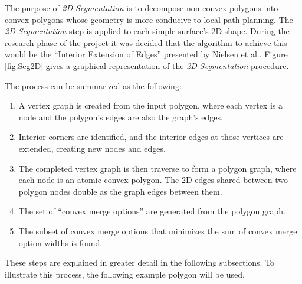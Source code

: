 The purpose of \textit{2D Segmentation} is to decompose non-convex polygons into convex polygons whose geometry is more conducive to local path planning.
The \textit{2D Segmentation} step is applied to each simple surface's 2D shape.
During the research phase of the project it was decided that the algorithm to achieve this would be the ``Interior Extension of Edges'' presented by Nielsen et al.\cite{IntEdgeExt}.
Figure \ref{fig:Seg2D} gives a graphical representation of the \textit{2D Segmentation} procedure.

The process can be summarized as the following:
\begin{enumerate}
	\item A vertex graph is created from the input polygon, where each vertex is a node and the polygon's edges are also the graph's edges.
	\item Interior corners are identified, and the interior edges at those vertices are extended, creating new nodes and edges.
	\item The completed vertex graph is then traverse to form a polygon graph, where each node is an atomic convex polygon.
		The 2D edges shared between two polygon nodes double as the graph edges between them.
	\item The set of ``convex merge options'' are generated from the polygon graph.
	\item The subset of convex merge options that minimizes the sum of convex merge option widths is found.
\end{enumerate}
These steps are explained in greater detail in the following subsections.
To illustrate this process, the following example polygon will be used.

